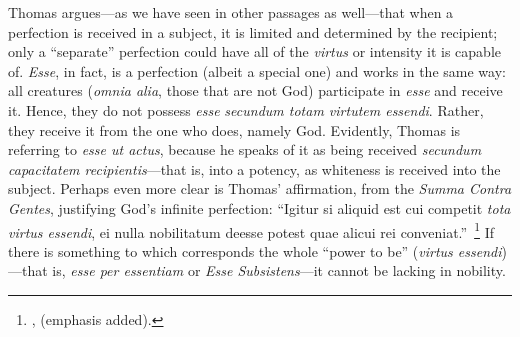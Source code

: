 %
Thomas argues—as we have seen in other passages as well—that when a perfection is received in a subject, it is limited and determined by the recipient; only a “separate” perfection could have all of the \emph{virtus} or intensity  it is capable of. \emph{Esse}, in fact, is a perfection (albeit a special one) and works in the same way: all creatures (\emph{omnia alia}, those that are not God) participate in \emph{esse} and receive it. Hence, they do not possess \emph{esse} \emph{secundum totam virtutem essendi}. Rather, they receive it from the one who does, namely God. Evidently, Thomas is referring to \emph{esse ut actus}, because he speaks of it as being received \emph{secundum capacitatem recipientis}—that is, into a potency, as whiteness is received into the subject. Perhaps even more clear is Thomas’ affirmation, from the \emph{Summa Contra Gentes}, justifying God’s infinite perfection: “Igitur si aliquid est cui competit \emph{tota virtus essendi}, ei nulla nobilitatum deesse potest quae alicui rei conveniat.”\,%
%
\footnote{\Cite[I, cap.~28, n.~2 (Marietti n.~260)]{st:contragent}, (emphasis added).} If there is something to which corresponds the whole “power to be” (\emph{virtus essendi})—that is, \emph{esse per essentiam} or \emph{Esse Subsistens}—it cannot be lacking in nobility.

